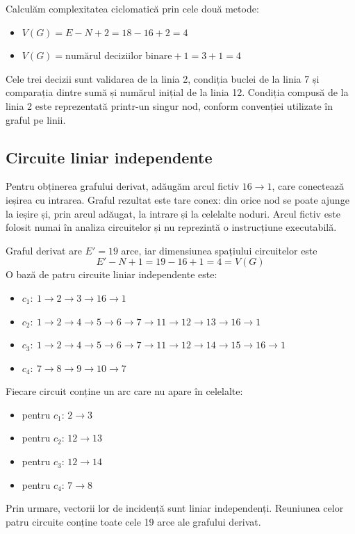 \documentclass[11pt,a4paper]{article}
\begin{document}
Calculăm complexitatea ciclomatică prin cele două metode:
\begin{itemize}[label=\textbullet]
\item $V(G)=E-N+2=18-16+2=4$
\item $V(G)=\text{numărul deciziilor binare}+1=3+1=4$
\end{itemize}
Cele trei decizii sunt validarea de la linia 2, condiția buclei de la linia 7
și comparația dintre sumă și numărul inițial de la linia 12.
Condiția compusă de la linia 2 este reprezentată printr-un singur nod,
conform convenției utilizate în graful pe linii.

\subsection{Circuite liniar independente}
Pentru obținerea grafului derivat, adăugăm arcul fictiv $16\to1$, care
conectează ieșirea cu intrarea. Graful rezultat este tare conex:
din orice nod se poate ajunge la ieșire și, prin arcul adăugat,
la intrare și la celelalte noduri. Arcul fictiv este folosit numai
în analiza circuitelor și nu reprezintă o instrucțiune executabilă.

Graful derivat are $E'=19$ arce, iar dimensiunea spațiului circuitelor este
\[
E'-N+1=19-16+1=4=V(G)
\]
O bază de patru circuite liniar independente este:
\begin{itemize}[label=\textbullet]
\item $c_1:\ 1\to2\to3\to16\to1$
\item $c_2:\ 1\to2\to4\to5\to6\to7\to11\to12\to13\to16\to1$
\item $c_3:\ 1\to2\to4\to5\to6\to7\to11\to12\to14\to15\to16\to1$
\item $c_4:\ 7\to8\to9\to10\to7$
\end{itemize}
Fiecare circuit conține un arc care nu apare în celelalte:
\begin{itemize}[label=\textbullet]
\item pentru $c_1$: $2\to3$
\item pentru $c_2$: $12\to13$
\item pentru $c_3$: $12\to14$
\item pentru $c_4$: $7\to8$
\end{itemize}
Prin urmare, vectorii lor de incidență sunt
liniar independenți. Reuniunea celor patru circuite conține toate cele
19 arce ale grafului derivat.
\end{document}
